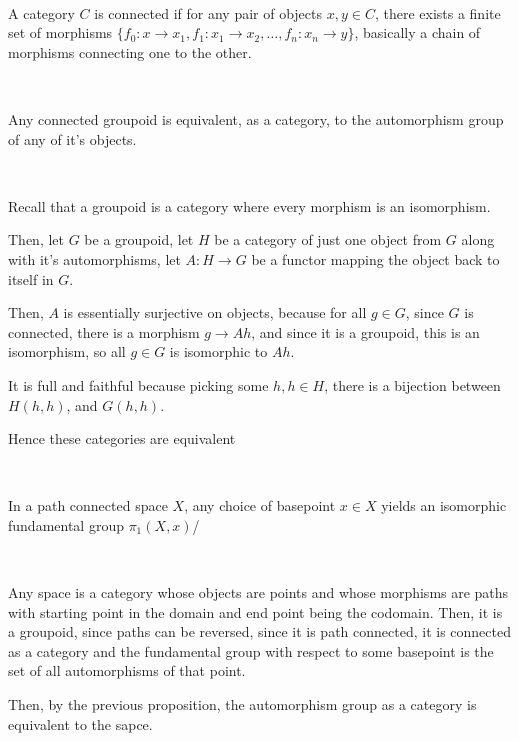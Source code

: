\documentclass{article}
\begin{document}
\begin{definition}
\

A category $C$ is connected if for any pair of objects $x,y \in C$, there exists a finite set of morphisms $\{f_0: x \to x_1, f_1: x_1 \to x_2, \dots, f_n: x_n \to y\}$, basically a chain of morphisms connecting one to the other.
\end{definition}

\begin{proposition}
\

Any connected groupoid is equivalent, as a category, to the automorphism group of any of it's objects.
\end{proposition}

\begin{customproof}
\

Recall that a groupoid is a category where every morphism is an isomorphism.

Then, let $G$ be a groupoid, let $H$ be a category of just one object from $G$ along with it's automorphisms, let $A: H \to G$ be a functor mapping the object back to itself in $G$. 

Then, $A$ is essentially surjective on objects, because for all $g \in G$, since $G$ is connected, there is a morphism $g \to Ah$, and since it is a groupoid, this is an isomorphism, so all $g \in G$ is isomorphic to $Ah$.


It is full and faithful because picking some $h, h \in H$, there is a bijection between $H(h,h)$, and $G(h,h)$.

Hence these categories are equivalent
\end{customproof}

\begin{corollary}
\

In a path connected space $X$, any choice of basepoint $x \in X$ yields an isomorphic fundamental group $\pi_1(X,x)$/
\end{corollary}

\begin{customproof}
\

Any space is a category whose objects are points and whose morphisms are paths with starting point in the domain and end point being the codomain. Then, it is a groupoid, since paths can be reversed, since it is path connected, it is connected as a category and the fundamental group with respect to some basepoint is the set of all automorphisms of that point. 

Then, by the previous proposition, the automorphism group as a category is equivalent to the sapce.
\end{customproof}
\end{document}
